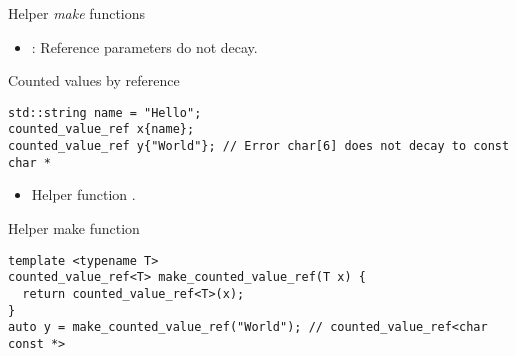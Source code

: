 \begin{frame}[t,fragile]{Helper \emph{make} functions}
\begin{itemize}
  \item {}: Reference parameters do not decay.
\end{itemize}

\begin{block}{Counted values by reference}
\begin{lstlisting}
std::string name = "Hello";
counted_value_ref x{name};
counted_value_ref y{"World"}; // Error char[6] does not decay to const char *
\end{lstlisting}
\end{block}

\begin{itemize}
  \item Helper function .
\end{itemize}

\begin{block}{Helper make function}
\begin{lstlisting}
template <typename T>
counted_value_ref<T> make_counted_value_ref(T x) {
  return counted_value_ref<T>(x);
}
auto y = make_counted_value_ref("World"); // counted_value_ref<char const *>
\end{lstlisting}
\end{block}

\end{frame}


